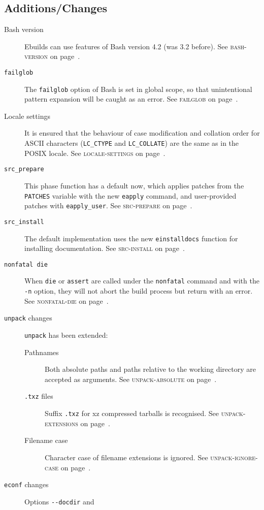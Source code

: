 \documentclass[a4paper,nofoldmark]{leaflet}
\newcommand{\code}[1]{\texttt{#1}}
\newcommand{\featureref}[1]{\textsc{#1} on page~\pageref{feat:#1}}
\begin{document}
\subsection{Additions/Changes}
\label{sec:cs:eapi6-additions}
\begin{description}
    \item[Bash version] Ebuilds can use features of Bash version 4.2
    (was 3.2 before).
    See \featureref{bash-version}.
    \item[\code{failglob}] The \code{failglob} option of Bash is set
    in global scope, so that unintentional pattern expansion will be
    caught as an error.
    See \featureref{failglob}.
    \item[Locale settings] It is ensured that the behaviour of case
    modification and collation order for ASCII characters
    (\code{LC_CTYPE} and \code{LC_COLLATE}) are the same as in the
    POSIX locale.
    See \featureref{locale-settings}.
    \item[\code{src_prepare}] This phase function has a default now,
    which applies patches from the \code{PATCHES} variable with the
    new \code{eapply} command, and user-provided patches with
    \code{eapply_user}.
    See \featureref{src-prepare}.
    \item[\code{src_install}] The default implementation uses the new
    \code{einstalldocs} function for installing documentation.
    See \featureref{src-install}.
    \item[\code{nonfatal die}] When \code{die} or \code{assert} are
    called under the \code{nonfatal} command and with the \code{-n}
    option, they will not abort the build process but return with an
    error.
    See \featureref{nonfatal-die}.
    \item[\code{unpack} changes] \code{unpack} has been extended:
    \begin{description}
        \item[Pathnames] Both absolute paths and paths relative to the
        working directory are accepted as arguments.
        See \featureref{unpack-absolute}.
        \item[\code{.txz} files] Suffix \code{.txz} for xz compressed
        tarballs is recognised.
        See \featureref{unpack-extensions}.
        \item[Filename case] Character case of filename extensions is
        ignored.
        See \featureref{unpack-ignore-case}.
    \end{description}
    \item[\code{econf} changes] Options \code{-{}-docdir} and

\end{description}
\end{document}
